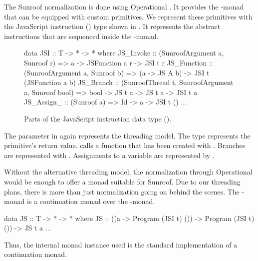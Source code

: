 The Sunroof normalization is done using Operational 
\cite{Apfelmus:10:Operational,Hackage:10:Operational}.
It provides the -monad that
can be equipped with custom primitives.
We represent these primitives with the JavaScript instruction
(\JSI)
type shown in . It represents the 
abstract instructions that are sequenced inside 
the -monad.
\begin{figure}[t]
\begin{Code}
data JSI :: T -> * -> * where
  JS_Invoke   :: (SunroofArgument a, Sunroof r) 
              => a -> JSFunction a r -> JSI t r
  JS_Function :: (SunroofArgument a, Sunroof b) 
              => (a -> JS A b) -> JSI t (JSFunction a b)
  JS_Branch   :: (SunroofThread t, SunroofArgument a, Sunroof bool) 
              => bool -> JS t a -> JS t a  -> JSI t a
  JS_Assign_  :: (Sunroof a) => Id -> a -> JSI t ()
  ...
\end{Code}
\caption{Parts of the JavaScript instruction data type (\JSI).}
\label{fig:jsi-definition}
\end{figure}
The parameter  in  again represents the threading model.
The type  represents the primitive's return value. 
 calls a function that has been created with .
Branches are represented with . Assignments to a variable
are represented by .

Without the alternative threading model, 
the normalization through Operational
would be enough to offer a monad suitable for Sunroof.
Due to our threading plans, there is more than just 
normalization going on behind the scenes. 
The \JS-monad is a continuation monad over the 
-monad.
\begin{Code}
data JS :: T -> * -> * where
  JS :: ((a -> Program (JSI t) ()) -> Program (JSI t) ()) -> JS t a
  ...
\end{Code}
Thus, the internal monad instance used is the standard implementation of 
a continuation monad.

